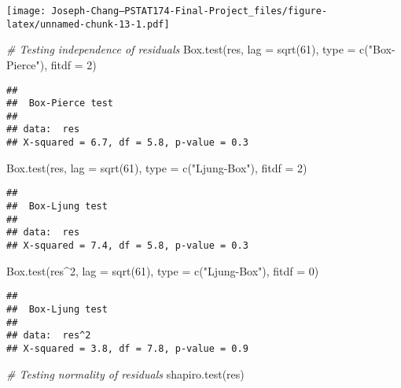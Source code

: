 \documentclass[
]{article}
\newenvironment{Shaded}{\begin{snugshade}}{\end{snugshade}}
\newcommand{\AttributeTok}[1]{\textcolor[rgb]{0.77,0.63,0.00}{#1}}
\newcommand{\CommentTok}[1]{\textcolor[rgb]{0.56,0.35,0.01}{\textit{#1}}}
\newcommand{\DecValTok}[1]{\textcolor[rgb]{0.00,0.00,0.81}{#1}}
\newcommand{\FunctionTok}[1]{\textcolor[rgb]{0.00,0.00,0.00}{#1}}
\newcommand{\NormalTok}[1]{#1}
\newcommand{\SpecialCharTok}[1]{\textcolor[rgb]{0.00,0.00,0.00}{#1}}
\newcommand{\StringTok}[1]{\textcolor[rgb]{0.31,0.60,0.02}{#1}}
\begin{document}
\texttt{[image: Joseph-Chang---PSTAT174-Final-Project\_files/figure-latex/unnamed-chunk-13-1.pdf]}

\begin{Shaded}
\begin{Highlighting}[]
\CommentTok{\# Testing independence of residuals}
\FunctionTok{Box.test}\NormalTok{(res, }\AttributeTok{lag =} \FunctionTok{sqrt}\NormalTok{(}\DecValTok{61}\NormalTok{), }\AttributeTok{type =} \FunctionTok{c}\NormalTok{(}\StringTok{"Box{-}Pierce"}\NormalTok{), }\AttributeTok{fitdf =} \DecValTok{2}\NormalTok{)}
\end{Highlighting}
\end{Shaded}

\begin{verbatim}
## 
##  Box-Pierce test
## 
## data:  res
## X-squared = 6.7, df = 5.8, p-value = 0.3
\end{verbatim}

\begin{Shaded}
\begin{Highlighting}[]
\FunctionTok{Box.test}\NormalTok{(res, }\AttributeTok{lag =} \FunctionTok{sqrt}\NormalTok{(}\DecValTok{61}\NormalTok{), }\AttributeTok{type =} \FunctionTok{c}\NormalTok{(}\StringTok{"Ljung{-}Box"}\NormalTok{), }\AttributeTok{fitdf =} \DecValTok{2}\NormalTok{)}
\end{Highlighting}
\end{Shaded}

\begin{verbatim}
## 
##  Box-Ljung test
## 
## data:  res
## X-squared = 7.4, df = 5.8, p-value = 0.3
\end{verbatim}

\begin{Shaded}
\begin{Highlighting}[]
\FunctionTok{Box.test}\NormalTok{(res}\SpecialCharTok{\^{}}\DecValTok{2}\NormalTok{, }\AttributeTok{lag =} \FunctionTok{sqrt}\NormalTok{(}\DecValTok{61}\NormalTok{), }\AttributeTok{type =} \FunctionTok{c}\NormalTok{(}\StringTok{"Ljung{-}Box"}\NormalTok{), }\AttributeTok{fitdf =} \DecValTok{0}\NormalTok{)}
\end{Highlighting}
\end{Shaded}

\begin{verbatim}
## 
##  Box-Ljung test
## 
## data:  res^2
## X-squared = 3.8, df = 7.8, p-value = 0.9
\end{verbatim}

\begin{Shaded}
\begin{Highlighting}[]
\CommentTok{\# Testing normality of residuals}
\FunctionTok{shapiro.test}\NormalTok{(res)}
\end{Highlighting}
\end{Shaded}
\end{document}
